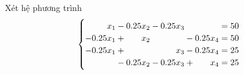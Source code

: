 \documentclass[../../Lectures]{subfiles}
\begin{document}
\begin{exmp}\label{exmp:3.4}
    Xét hệ phương trình
    \[
        \left\{
            \setlength{\arraycolsep}{0pt}%
            \renewcommand{\arraystretch}{1.2}%
            \begin{array}{ *{5}{ r >{ {} } c <{ {} } } r }
                            x_1 &-& \num{0.25} x_2 &-& \num{0.25} x_3 & &                &=& 50  \\
                \num{-0.25} x_1 &+&            x_2 & &                &-& \num{0.25} x_4 &=& 50  \\
                \num{-0.25} x_1 &+&                & &            x_3 &-& \num{0.25} x_4 &=& 25  \\
                                &-& \num{0.25} x_2 &-& \num{0.25} x_3 &+&            x_4 &=& 25    %
            \end{array}
        \right.    %
    \]


\end{exmp}
\end{document}
